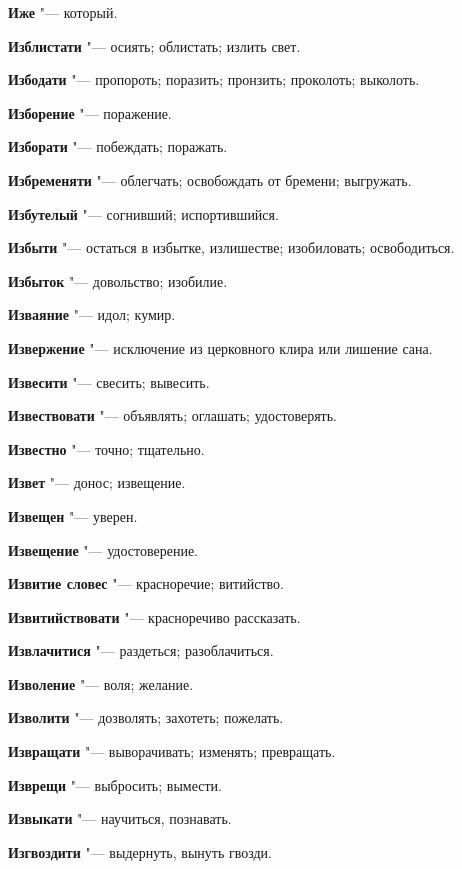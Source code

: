 \begin{mymulticols}
\noindent\textbf{Иже} "--- который. 

\noindent\textbf{Изблистати} "--- осиять; облистать; излить свет. 

\noindent\textbf{Избодати} "--- пропороть; поразить; пронзить; проколоть; выколоть. 

\noindent\textbf{Изборение} "--- поражение. 

\noindent\textbf{Изборати} "--- побеждать; поражать. 

\noindent\textbf{Избременяти} "--- облегчать; освобождать от бремени; выгружать. 

\noindent\textbf{Избутелый} "--- согнивший; испортившийся. 

\noindent\textbf{Избыти} "--- остаться в избытке, излишестве; изобиловать; освободиться. 

\noindent\textbf{Избыток} "--- довольство; изобилие. 

\noindent\textbf{Изваяние} "--- идол; кумир. 

\noindent\textbf{Извержение} "--- исключение из церковного клира или лишение сана. 

\noindent\textbf{Извесити} "--- свесить; вывесить. 

\noindent\textbf{Извествовати} "--- объявлять; оглашать; удостоверять. 

\noindent\textbf{Известно} "--- точно; тщательно. 

\noindent\textbf{Извет} "--- донос; извещение. 

\noindent\textbf{Извещен} "--- уверен. 

\noindent\textbf{Извещение} "--- удостоверение. 

\noindent\textbf{Извитие словес} "--- красноречие; витийство. 

\noindent\textbf{Извитийствовати} "--- красноречиво рассказать. 

\noindent\textbf{Извлачитися} "--- раздеться; разоблачиться. 

\noindent\textbf{Изволение} "--- воля; желание. 

\noindent\textbf{Изволити} "--- дозволять; захотеть; пожелать. 

\noindent\textbf{Извращати} "--- выворачивать; изменять; превращать. 

\noindent\textbf{Изврещи} "--- выбросить; вымести. 

\noindent\textbf{Извыкати} "--- научиться, познавать. 

\noindent\textbf{Изгвоздити} "--- выдернуть, вынуть гвозди. 


\end{mymulticols}
